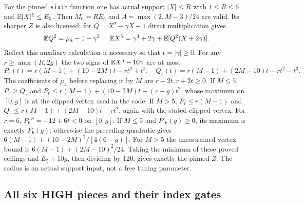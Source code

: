 For the pinned \texttt{sixth} function one has actual support $|X|\le R$
with $1\le R\le6$ and $\mathbb E|X|^5\le E_5$. Then $M_6=RE_5$ and
$A=\max(2,M-3)/24$ are valid. Its sharper $Z$ is also licensed:
for $Q=X^2-\gamma X-1$ direct multiplication gives
\[
 \mathbb E Q^2=\mu_4-1-\gamma^2,\quad
 \mathbb E X^5=\gamma^3+2\gamma+\mathbb E[Q^2(X+2\gamma)].
\]
Reflect this auxiliary calculation if necessary so that
$t=|\gamma|\ge0$. For any $r\ge\max(R,2g)$ the two signs of
$\mathbb E X^5-10\gamma$ are at most
\[
 P_r(t)=r(M-1)+(10-2M)t-rt^2+t^3,
 \quad Q_r(t)=r(M-1)+(2M-10)t-rt^2-t^3.
\]
The coefficients of $\mu_4$ before replacing it by $M$ are
$r-2t,r+2t\ge0$. If $M\le5$, $P_r\ge Q_r$ and
$P_r\le r(M-1)+(10-2M)t-(r-g)t^2$, whose maximum on $[0,g]$
is at the clipped vertex used in the code. If $M>5$,
$P_r\le r(M-1)$ and
$Q_r\le r(M-1)+(2M-10)t-rt^2$, again with the stated clipped vertex.
For $r=6$, $P_6''=-12+6t<0$ on $[0,g]$. If $M\le5$ and
$P'_6(g)\ge0$, its maximum is exactly $P_6(g)$; otherwise the
preceding quadratic gives $6(M-1)+(10-2M)^2/[4(6-g)]$.
For $M>5$ the unrestrained vertex bound is
$6(M-1)+(2M-10)^2/24$. Taking the minimum of these proved ceilings
and $E_5+10g$, then dividing by $120$, gives exactly the pinned $Z$.
The radius is an actual support input, not a free tuning parameter.

\subsection{All six HIGH pieces and their index gates}

